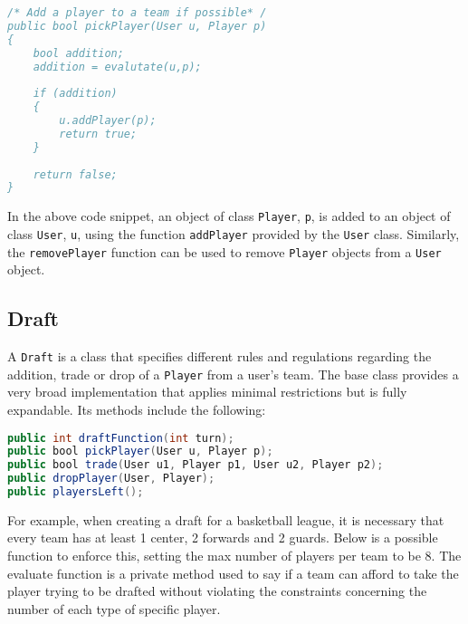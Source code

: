 \documentclass[12pt]{report}
\begin{document}
\begin{lstlisting}[language=Java,label=some-code,caption=Adding a Player]
/* Add a player to a team if possible* /
public bool pickPlayer(User u, Player p)
{
	bool addition;
	addition = evalutate(u,p);
	
	if (addition)
	{
		u.addPlayer(p);
		return true;
	}
	
	return false;
}
\end{lstlisting}

\begin{doublespace}
In the above code snippet, an object of class \texttt{Player}, \texttt{p}, is added to an object of class \texttt{User}, \texttt{u}, using the function \texttt{addPlayer} provided by the \texttt{User} class. Similarly, the \texttt{removePlayer} function can be used to remove \texttt{Player} objects from a \texttt{User} object.

\subsection{Draft}
A \texttt{Draft} is a class that specifies different rules and regulations regarding the addition, trade or drop of a \texttt{Player} from a user's team. The base class provides a very broad implementation that applies minimal restrictions but is fully expandable. Its methods include the following:
\end{doublespace}

\begin{lstlisting}[language=Java,label=some-code,caption=Draft methods]
public int draftFunction(int turn);
public bool pickPlayer(User u, Player p);
public bool trade(User u1, Player p1, User u2, Player p2);
public dropPlayer(User, Player);
public playersLeft();
\end{lstlisting}

\begin{doublespace}
For example, when creating a draft for a basketball league, it is necessary that every team has at least 1 center, 2 forwards and 2 guards. Below is a possible function to enforce this, setting the max number of players per team to be 8. The evaluate function is a private method used to say if a team can afford to take the player trying to be drafted without violating the constraints concerning the number of each type of specific player.
\end{doublespace}
\end{document}
